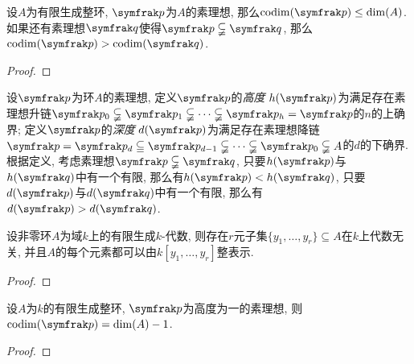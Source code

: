 \begin{proposition}\label{prop:primeidealdim}
  设$A$为有限生成整环, $\ideal{p}$为$A$的素理想, 那么$\codim (\ideal{p})\leq\dim (A)$. 如果还有素理想$\ideal{q}$使得$\ideal{p}\subsetneqq\ideal{q}$, 那么$\codim (\ideal{p})>\codim (\ideal{q})$.
\end{proposition}

\begin{proof}
\end{proof}

设$\ideal{p}$为环$A$的素理想,  定义$\ideal{p}$的\emph{高度} $h(\ideal{p})$为满足存在素理想升链$\ideal{p}_0\subsetneqq\ideal{p}_1\subsetneqq\dotsb\subsetneqq \ideal{p}_h=\ideal{p}$的$n$的上确界; 定义$\ideal{p}$的\emph{深度} $d(\ideal{p})$为满足存在素理想降链$\ideal{p}=\ideal{p}_d\subseteqq\ideal{p}_{d-1}\subsetneqq\dotsb\subsetneqq\ideal{p}_0\subsetneqq A$的$d$的下确界. 根据定义, 考虑素理想$\ideal{p}\subsetneqq\ideal{q}$, 只要$h(\ideal{p})$与$h(\ideal{q})$中有一个有限, 那么有$h(\ideal{p})<h(\ideal{q})$, 只要$d(\ideal{p})$与$d(\ideal{q})$中有一个有限, 那么有$d(\ideal{p})>d(\ideal{q})$.

\begin{proposition}\label{prop:noethernormalization}
  设非零环$A$为域$k$上的有限生成$k$-代数, 则存在$r$元子集$\{y_1, \dotsc, y_r\}\subseteq A$在$k$上代数无关, 并且$A$的每个元素都可以由$k[y_1, \dotsc, y_r]$整表示.
\end{proposition}

\begin{proof}
\end{proof}

\begin{proposition}\label{prop:heightoneideallemma}
  设$A$为$k$的有限生成整环, $\ideal{p}$为高度为一的素理想, 则$\codim (\ideal{p}) = \dim (A)-1$.
\end{proposition}

\begin{proof}
\end{proof}

